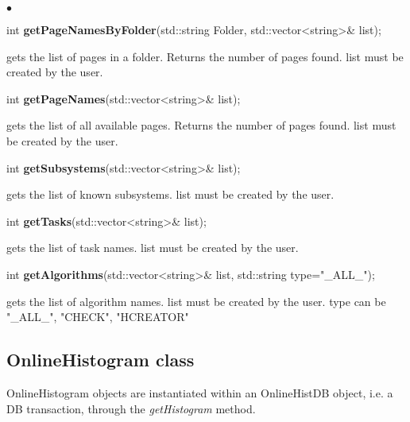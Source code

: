 \documentclass{lhcbnote}
\begin{document}
\begin{list}{$\bullet$}{}
\item   int {\bf getPageNamesByFolder}(std::string Folder,
			   std::vector<string>\& list);

  gets the list of pages in a folder. Returns the
number of pages found. list must be created by the user.

\item   int {\bf getPageNames}(std::vector<string>\& list);

gets the list of all available pages. Returns the
number of pages found. list must be created by the user.

\item  int {\bf  getSubsystems}(std::vector<string>\& list);

gets the list of known subsystems. list must be created by the user.

\item  int {\bf  getTasks}(std::vector<string>\& list);

gets the list of task names. list must be created by the user.

\item  int {\bf  getAlgorithms}(std::vector<string>\& list, std::string type="\_ALL\_");

gets the list of algorithm names. list must be created by the user.
type can be "\_ALL\_", "CHECK", "HCREATOR"


\end{list}


\subsection{OnlineHistogram class}

OnlineHistogram objects are instantiated within an
OnlineHistDB object, i.e. a DB transaction, through the {\it
getHistogram} method.
\end{document}

